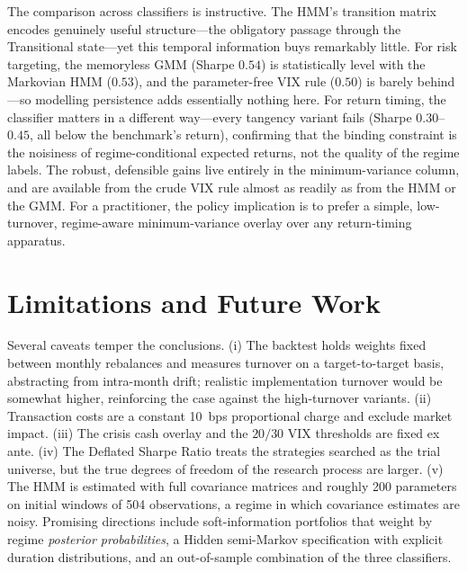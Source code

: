 \documentclass[12pt,a4paper]{article}
\begin{document}
The comparison across classifiers is instructive. The HMM's transition matrix encodes
genuinely useful structure---the obligatory passage through the Transitional state---yet
this temporal information buys remarkably little. For risk targeting, the memoryless GMM
(Sharpe $0.54$) is statistically level with the Markovian HMM ($0.53$), and the
parameter-free VIX rule ($0.50$) is barely behind---so modelling persistence adds
essentially nothing here. For return timing, the classifier matters in a different way---every
tangency variant fails (Sharpe $0.30$--$0.45$, all below the benchmark's return),
confirming that the binding constraint is the noisiness of regime-conditional expected
returns, not the quality of the regime labels. The robust, defensible gains live entirely in the minimum-variance column,
and are available from the crude VIX rule almost as readily as from the HMM or the GMM. For
a practitioner, the policy implication is to prefer a simple, low-turnover, regime-aware
minimum-variance overlay over any return-timing apparatus.

\section{Limitations and Future Work}\label{sec:limit}
Several caveats temper the conclusions. (i) The backtest holds weights fixed between
monthly rebalances and measures turnover on a target-to-target basis, abstracting from
intra-month drift; realistic implementation turnover would be somewhat higher,
reinforcing the case against the high-turnover variants. (ii) Transaction costs are a
constant 10~bps proportional charge and exclude market impact. (iii) The crisis cash
overlay and the $20/30$ VIX thresholds are fixed ex ante. (iv) The Deflated Sharpe Ratio
treats the strategies searched as the trial universe, but the true degrees of freedom of
the research process are larger. (v) The HMM is estimated with full covariance matrices and
roughly 200 parameters on initial windows of 504 observations, a regime in which
covariance estimates are noisy. Promising directions include soft-information portfolios
that weight by regime \emph{posterior probabilities}, a Hidden semi-Markov specification
with explicit duration distributions, and an out-of-sample combination of the three
classifiers.

\end{document}
